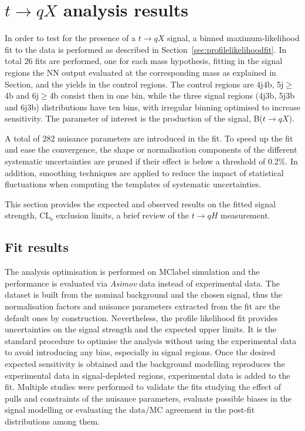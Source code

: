 \chapter{$t\to qX$ analysis results}
\label{chapter:tqXresults}

In order to test for the presence of a $t\to qX$ signal, a binned maximum-likelihood fit to the data is performed as described in Section~\ref{sec:profilelikelihoodfit}. In total 26 fits are performed, one for each mass hypothesis, fitting in the signal regions the NN output evaluated at the corresponding mass as explained in Section, and the yields in the control regions. The control regions are 4j4b, 5j$\geq$4b and 6j$\geq$4b consist then in one bin, while the three signal regions (4j3b, 5j3b and 6j3b) distributions have ten bins, with irregular binning optimised to increase sensitivity. The parameter of interest is the production of the signal, B($t\to qX$).

A total of 282 nuisance parameters are introduced in the fit. To speed up the fit and ease the convergence, the shape or normalisation components of the different systematic uncertainties are pruned if their effect is below a threshold of 0.2\%. In addition, smoothing techniques are applied to reduce the impact of statistical fluctuations when computing the templates of systematic uncertainties.

This section provides the expected and observed results on the fitted signal strength, CL$_{\text{s}}$ exclusion limits, a brief review of the $t\to qH$ measurement.

\section{Fit results}

The analysis optimisation is performed on \acrshort{MClabel} simulation and the performance is evaluated via \textit{Asimov} data instead of experimental data. The dataset is built from the nominal background and the chosen signal, thus the normalisation factors and nuisance parameters extracted from the fit are the default ones by construction. Nevertheless, the profile likelihood fit provides uncertainties on the signal strength and the expected upper limits. It is the standard procedure to optimise the analysis without using the experimental data to avoid introducing any bias, especially in signal regions. Once the desired expected sensitivity is obtained and the background modelling reproduces the experimental data in signal-depleted regions, experimental data is added to the fit. Multiple studies were performed to validate the fits studying the effect of pulls and constraints of the nuisance parameters, evaluate possible biases in the signal modelling or evaluating the data/MC agreement in the post-fit distributions among them.

